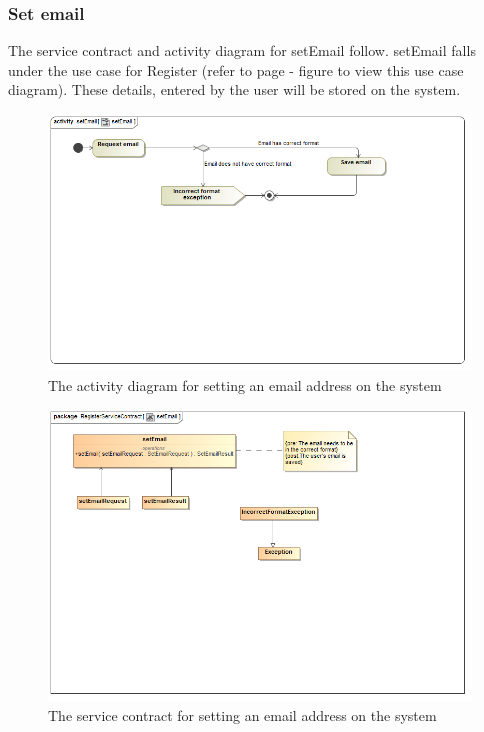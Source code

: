 \documentclass[a4paper,12pt]{article}
\begin{document}
\subsubsection{Set email}
The service contract and activity diagram for setEmail follow. setEmail falls under the use case for Register (refer to page   - figure  to view this use case diagram). These details, entered by the user will be stored on the system.
\begin{figure}[H]
  \centering
    \includegraphics[width=1.0\textwidth]{../diagrams/Register/ActivityDiagrams/setEmail1.png}
    \caption{The activity diagram for setting an email address on the system} 
\end{figure}
\begin{figure}[H]
  \centering
    \includegraphics[width=1.0\textwidth]{../diagrams/Register/ServiceContractsRegister/setEmailServiceContract.png}
    \caption{The service contract for setting an email address on the system} 
\end{figure}
\end{document}
